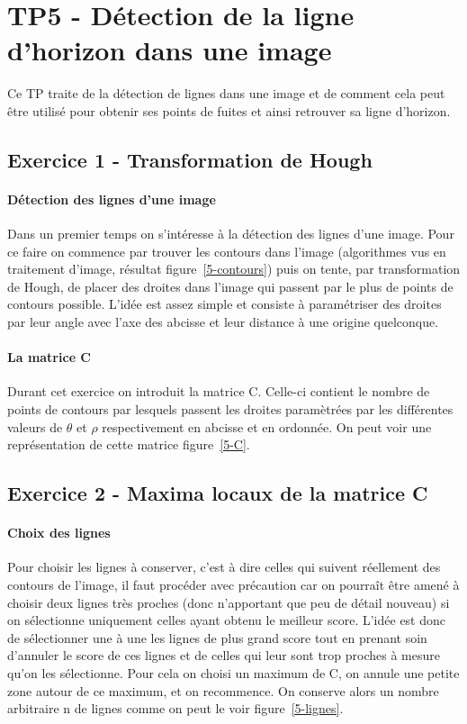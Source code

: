 \section{TP5 - Détection de la ligne d'horizon dans une image}
Ce TP traite de la détection de lignes dans une image et de comment cela peut être utilisé pour obtenir ses points de fuites et ainsi retrouver sa ligne d'horizon.

\subsection{Exercice 1 - Transformation de Hough}
\paragraph{Détection des lignes d'une image}
Dans un premier temps on s'intéresse à la détection des lignes d'une image. Pour ce faire on commence par trouver les contours dans l'image (algorithmes vus en traitement d'image, résultat figure~\ref{5-contours}) puis on tente, par transformation de Hough, de placer des droites dans l'image qui passent par le plus de points de contours possible. L'idée est assez simple et consiste à paramétriser des droites par leur angle avec l'axe des abcisse et leur distance à une origine quelconque.

\begin{figure}
\end{figure}

\paragraph{La matrice C}
Durant cet exercice on introduit la matrice C. Celle-ci contient le nombre de points de contours par lesquels passent les droites paramètrées par les différentes valeurs de $\theta$ et $\rho$ respectivement en abcisse et en ordonnée. On peut voir une représentation de cette matrice figure~\ref{5-C}.

\subsection{Exercice 2 - Maxima locaux de la matrice C}
\paragraph{Choix des lignes}
Pour choisir les lignes à conserver, c'est à dire celles qui suivent réellement des contours de l'image, il faut procéder avec précaution car on pourraît être amené à choisir deux lignes très proches (donc n'apportant que peu de détail nouveau) si on sélectionne uniquement celles ayant obtenu le meilleur score. L'idée est donc de sélectionner une à une les lignes de plus grand score tout en prenant soin d'annuler le score de ces lignes et de celles qui leur sont trop proches à mesure qu'on les sélectionne. Pour cela on choisi un maximum de C, on annule une petite zone autour de ce maximum, et on recommence. On conserve alors un nombre arbitraire n de lignes comme on peut le voir figure~\ref{5-lignes}.

